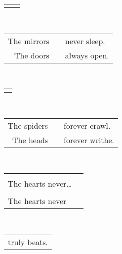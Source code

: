\documentclass{article}
\begin{document}
\begin{center}
\begin{tabular}{ll}
&\\
\end{tabular}\\
\begin{tabular}{rcl}
The mirrors\thinspace\thinspace & \hspace*{4ex} & never sleep. \\
The doors\thinspace\thinspace && always open.\hspace*{3.8ex} \\
\end{tabular}\\
\begin{tabular}{c}
\\
\\
\end{tabular}\\
\begin{tabular}{rcl}
The spiders & \hspace*{4ex}\thinspace\thinspace & forever crawl.\hspace*{3.6ex} \\
The heads && forever writhe. \\
\end{tabular} \\
\begin{tabular}{ll}
&\\
The hearts never\ldots{} &\\
&\\
The hearts never &\\
\end{tabular}\\
\begin{tabular}{l}
truly beats. \\
\end{tabular}
\end{center}
\end{document}
